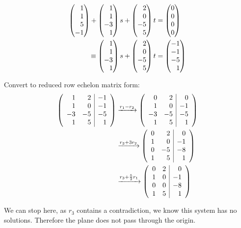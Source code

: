 \documentclass[12pt]{article}
\newenvironment{abc}{\begin{enumerate}[label={\bf(\alph*)}]}{\end{enumerate}}
\newcommand\m[2][]{
	\ifthenelse{\equal {#1} {}}
		{\begin{pmatrix*}[r]#2\end{pmatrix*}}
		{\left(\begin{array}{#1}#2\end{array}\right)}
}
\begin{document}
\begin{abc}
{	\begin{equation}
	\begin{aligned}
		\m{1 \\ 1 \\ 5 \\ -1} + \m{1 \\ 1 \\ -3 \\ 1} s + \m{2 \\ 0 \\ -5 \\ 5} t &= \m{0 \\ 0 \\ 0 \\ 0} \\
		\equiv \m{1 \\ 1 \\ -3 \\ 1} s + \m{2 \\ 0 \\ -5 \\ 5} t &= \m{-1 \\ -1 \\ -5 \\ 1}
	\end{aligned}
	\end{equation}

	Convert to reduced row echelon matrix form:
	\begin{equation}
	\begin{aligned}
		\m[rr|r]{1 & 2 & -1 \\ 1 & 0 & -1 \\ -3 & -5 & -5 \\ 1 & 5 & 1}
		&\xrightarrow{r_1 - r_2}
		\m[rr|r]{0 & 2 & 0 \\ 1 & 0 & -1 \\ -3 & -5 & -5 \\ 1 & 5 & 1}
		\\
		&\xrightarrow{r_3 + 3r_2}
		\m[rr|r]{0 & 2 & 0 \\ 1 & 0 & -1 \\ 0 & -5 & -8 \\ 1 & 5 & 1}
		\\
		&\xrightarrow{r_3 + \frac{5}{2}r_1}
		\m[rr|r]{0 & 2 & 0 \\ 1 & 0 & -1 \\ 0 & 0 & -8 \\ 1 & 5 & 1}
	\end{aligned}
	\end{equation}

	We can stop here, as $r_3$ contains a contradiction, we know this system has no solutions. Therefore the plane does not pass through the origin.
}
\end{abc}
\end{document}
